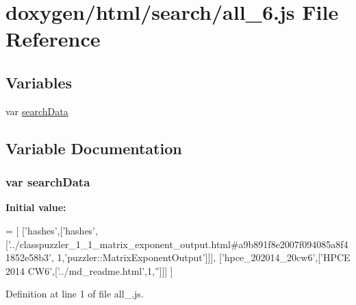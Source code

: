 \hypertarget{a00051}{}\section{doxygen/html/search/all\+\_\+6.js File Reference}
\label{a00051}
\subsection*{Variables}
\begin{DoxyCompactItemize}
\item 
var \hyperlink{a00051_ad01a7523f103d6242ef9b0451861231e}{search\+Data}
\end{DoxyCompactItemize}


\subsection{Variable Documentation}
\hypertarget{a00051_ad01a7523f103d6242ef9b0451861231e}{}
\subsubsection[{search\+Data}]{\setlength{\rightskip}{0pt plus 5cm}var search\+Data}\label{a00051_ad01a7523f103d6242ef9b0451861231e}
{\bfseries Initial value\+:}
\begin{DoxyCode}
=
[
  [\textcolor{stringliteral}{'hashes'},[\textcolor{stringliteral}{'hashes'},[\textcolor{stringliteral}{'../classpuzzler\_1\_1\_matrix\_exponent\_output.html#a9b891f8e2007f094085a8f41852e58b3'},
      1,\textcolor{stringliteral}{'puzzler::MatrixExponentOutput'}]]],
  [\textcolor{stringliteral}{'hpce\_202014\_20cw6'},[\textcolor{stringliteral}{'HPCE 2014 CW6'},[\textcolor{stringliteral}{'../md\_readme.html'},1,\textcolor{stringliteral}{''}]]]
]
\end{DoxyCode}


Definition at line 1 of file all\+\_.\+js.

